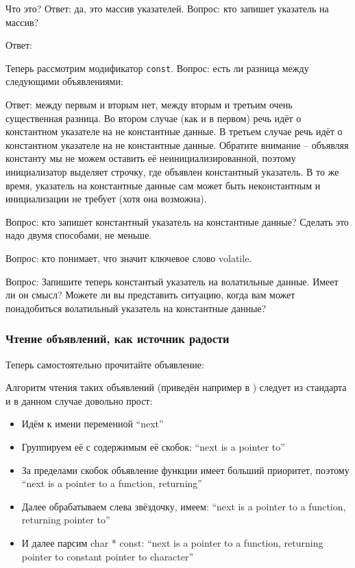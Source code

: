 \documentclass[a4paper,12pt,oneside]{article}
\begin{document}


Что это? Ответ: да, это массив указателей. Вопрос: кто запишет указатель на массив?

Ответ:



Теперь рассмотрим модификатор \lstinline!const!. Вопрос: есть ли разница между следующими объявлениями:



Ответ: между первым и вторым нет, между вторым и третьим очень существенная разница. Во втором случае (как и в первом) речь идёт о константном указателе на не константные данные. В третьем случае речь идёт о константном указателе на не константные данные. Обратите внимание -- объявляя константу мы не можем оставить её неинициализированной, поэтому инициализатор выделяет строчку, где объявлен константный указатель. В то же время, указатель на константные данные сам может быть неконстантным и инициализации не требует (хотя она возможна).

Вопрос: кто запишет константный указатель на константные данные? Сделать это надо двумя способами, не меньше.

Вопрос: кто понимает, что значит ключевое слово volatile.

Вопрос: Запишите теперь константый указатель на волатильные данные. Имеет ли он смысл? Можете ли вы представить ситуацию, когда вам может понадобиться волатильный указатель на константные данные?

\subsubsection{Чтение объявлений, как источник радости}\label{AlgDecl}

Теперь самостоятельно прочитайте объявление:



Алгоритм чтения таких объявлений (приведён например в \cite{linden}) следует из стандарта и в данном случае довольно прост:

\begin{itemize}
\item
Идём к имени переменной ``next''
\item
Группируем её с содержимым её скобок: ``next is a pointer to''
\item
За пределами скобок объявление функции имеет больший приоритет, поэтому ``next is a pointer to a function, returning''
\item
Далее обрабатываем слева звёздочку, имеем: ``next is a pointer to a function, returning pointer to''
\item
И далее парсим char * const: ``next is a pointer to a function, returning pointer to constant pointer to character''
\end{itemize}
\end{document}
